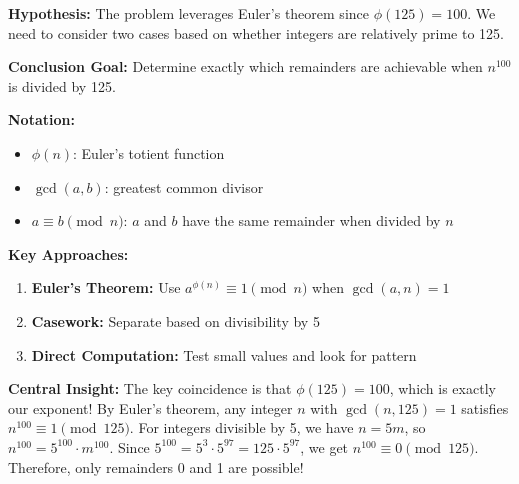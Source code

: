 \documentclass[12pt]{article}
\begin{document}
\begin{problemconfigbox}
\textbf{Hypothesis:} 
The problem leverages Euler's theorem since $\phi(125) = 100$. We need to consider two cases based on whether integers are relatively prime to 125.

\textbf{Conclusion Goal:}
Determine exactly which remainders are achievable when $n^{100}$ is divided by 125.

\textbf{Notation:}
\begin{itemize}
    \item $\phi(n)$: Euler's totient function
    \item $\gcd(a, b)$: greatest common divisor
    \item $a \equiv b \pmod{n}$: $a$ and $b$ have the same remainder when divided by $n$
\end{itemize}

\textbf{Key Approaches:}
\begin{enumerate}
    \item \textbf{Euler's Theorem:} Use $a^{\phi(n)} \equiv 1 \pmod{n}$ when $\gcd(a,n) = 1$
    \item \textbf{Casework:} Separate based on divisibility by 5
    \item \textbf{Direct Computation:} Test small values and look for pattern
\end{enumerate}
\end{problemconfigbox}

\vspace{1em}

\begin{keyinsightbox}
\textbf{Central Insight:} The key coincidence is that $\phi(125) = 100$, which is exactly our exponent! By Euler's theorem, any integer $n$ with $\gcd(n, 125) = 1$ satisfies $n^{100} \equiv 1 \pmod{125}$. For integers divisible by 5, we have $n = 5m$, so $n^{100} = 5^{100} \cdot m^{100}$. Since $5^{100} = 5^3 \cdot 5^{97} = 125 \cdot 5^{97}$, we get $n^{100} \equiv 0 \pmod{125}$. Therefore, only remainders 0 and 1 are possible!
\end{keyinsightbox}

\vspace{1em}
\end{document}
